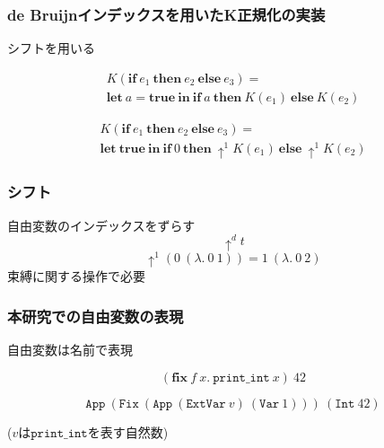 \documentclass[dvipdfmx,cjk,xcolor=dvipsnames,envcountsect,notheorems,12pt]{beamer}
\theoremstyle{definition}
\newcommand{\keyword}[1]{\mathbf{#1}}
\newcommand{\LET}{\keyword{let}}
\newcommand{\IF}{\keyword{if}}
\newcommand{\THEN}{\keyword{then}}
\newcommand{\ELSE}{\keyword{else}}
\newcommand{\FIX}{\keyword{fix}}
\newcommand{\IN}{\keyword{in}}
\newcommand{\TRUE}{\keyword{true}}
\begin{document}
\begin{frame}[fragile]
	\frametitle{de Bruijnインデックスを用いたK正規化の実装}
	\LARGE シフトを用いる

	\vfill

	{\large \[\begin{array}{l}
		K(\IF~e_1~\THEN~e_2~\ELSE~e_3) = \\
		\LET~a=\TRUE~\IN~\IF~a~\THEN~ K(e_1)~\ELSE~ K(e_2)
	\end{array}\]

	\vfill
	
	\[\begin{array}{l}
		K(\IF~e_1~\THEN~e_2~\ELSE~e_3) = \\
		\LET~\TRUE~\IN~\IF~0~\THEN~\uparrow^1 K(e_1)~\ELSE~\uparrow^1 K(e_2)
	\end{array}\]}
\end{frame}

\begin{frame}
	\frametitle{シフト}
	\LARGE 自由変数のインデックスをずらす
	\[\uparrow^d t \]
	\vfill
	\[\uparrow^1(0~(\lambda.~0~1)) = 1~(\lambda.~0~2)\]
	\vfill
	束縛に関する操作で必要
\end{frame}

\begin{frame}
	\frametitle{本研究での自由変数の表現}
	\LARGE
	自由変数は名前で表現

	\vfill

	{\Large \[(\FIX~f~x.~\texttt{print\_int}~x)~42\]

	\vfill

	\[\texttt{App}~(\texttt{Fix}~(\texttt{App}~(\texttt{ExtVar}~v)~(\texttt{Var}~1)))~(\texttt{Int}~42)\]}
	{\large \begin{center}
		($v$は$\texttt{print\_int}$を表す自然数)
	\end{center}}
\end{frame}
\end{document}
